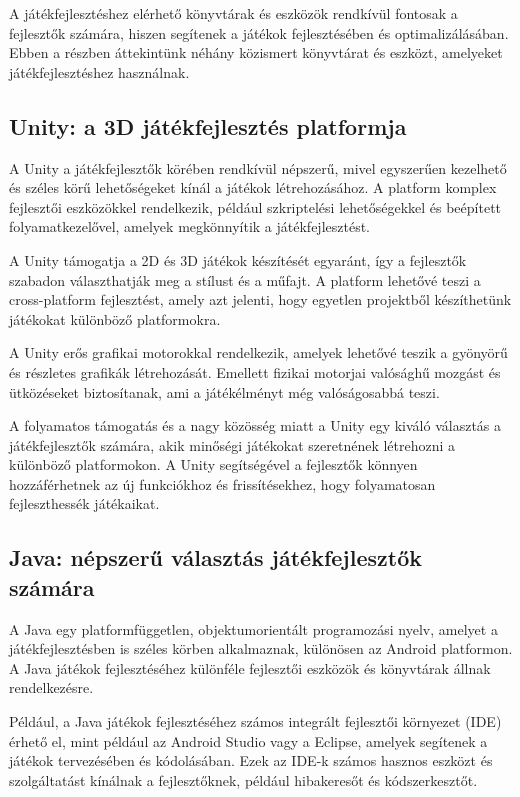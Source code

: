\indent \indent A játékfejlesztéshez elérhető könyvtárak és eszközök rendkívül fontosak a fejlesztők számára, hiszen segítenek a játékok fejlesztésében és optimalizálásában. Ebben a részben áttekintünk néhány közismert könyvtárat és eszközt, amelyeket játékfejlesztéshez használnak.

\bigskip

\subsection{Unity: a 3D játékfejlesztés platformja}

A Unity\cite{unity-docs, unity-web} a játékfejlesztők körében rendkívül népszerű, mivel egyszerűen kezelhető és széles körű lehetőségeket kínál a játékok létrehozásához. A platform komplex fejlesztői eszközökkel rendelkezik, például szkriptelési lehetőségekkel és beépített folyamatkezelővel, amelyek megkönnyítik a játékfejlesztést. 

A Unity támogatja a 2D és 3D játékok készítését egyaránt, így a fejlesztők szabadon választhatják meg a stílust és a műfajt. A platform lehetővé teszi a cross-platform fejlesztést, amely azt jelenti, hogy egyetlen projektből készíthetünk játékokat különböző platformokra.

A Unity erős grafikai motorokkal rendelkezik, amelyek lehetővé teszik a gyönyörű és részletes grafikák létrehozását. Emellett fizikai motorjai valósághű mozgást és ütközéseket biztosítanak, ami a játékélményt még valóságosabbá teszi.

A folyamatos támogatás és a nagy közösség miatt a Unity egy kiváló választás a játékfejlesztők számára, akik minőségi játékokat szeretnének létrehozni a különböző platformokon. A Unity segítségével a fejlesztők könnyen hozzáférhetnek az új funkciókhoz és frissítésekhez, hogy folyamatosan fejleszthessék játékaikat.
\subsection{Java: népszerű választás játékfejlesztők számára}
\indent \indent A Java\cite{java-doc, java} egy platformfüggetlen, objektumorientált programozási nyelv, amelyet a játékfejlesztésben is széles körben alkalmaznak, különösen az Android platformon. A Java játékok fejlesztéséhez különféle fejlesztői eszközök és könyvtárak állnak rendelkezésre.

Például, a Java játékok fejlesztéséhez számos integrált fejlesztői környezet (IDE) érhető el, mint például az Android Studio vagy a Eclipse, amelyek segítenek a játékok tervezésében és kódolásában. Ezek az IDE-k számos hasznos eszközt és szolgáltatást kínálnak a fejlesztőknek, például hibakeresőt és kódszerkesztőt.

